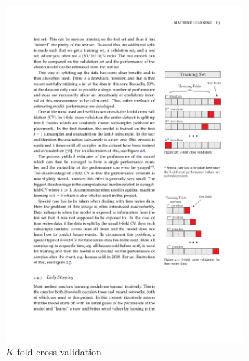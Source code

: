\begin{figure}[htbp]
    \centering
    \begin{subfigure}{.5\textwidth}
        \centering
        \includegraphics[trim={14cm 17cm 1.95cm 6.5cm}, clip, width=.8\linewidth]{figures/MasterThesis-cross-validation}
        \caption{$K$-fold cross validation}
        \label{fig:ML-crossval-kfold}
    \end{subfigure}%
    \begin{subfigure}{.5\textwidth}
        \centering

\end{subfigure}
\end{figure}
